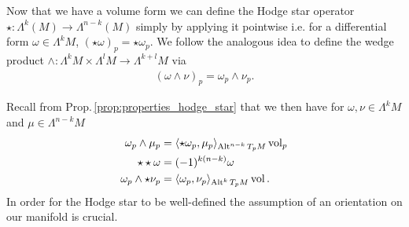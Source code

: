 \documentclass[../master_thesis.tex]{subfiles}
\begin{document}


Now that we have a volume form we can define the Hodge star operator
$\star: \Lambda^k(M) \rightarrow \Lambda^{n-k}(M)$ 
simply by applying it 
pointwise i.e. for a differential form $\omega \in \Lambda^k M$, $(\star \omega)_p = \star \omega_p$. 
We follow the analogous idea to define the wedge product
$\wedge: \Lambda^k M \times \Lambda^l M \rightarrow \Lambda^{k+l} M$ via
\begin{align*}
    (\omega \wedge \nu )_p = \omega_p \wedge \nu_p. 
\end{align*} 

Recall from Prop.\,\ref{prop:properties_hodge_star} that we then have for $\omega, \nu \in \Lambda^k M$ and 
$\mu \in \Lambda^{n-k} M$
\begin{align*}
    \omega_p \wedge \mu_p &= \langle \star \omega_p, \mu_p \rangle _{{\text{Alt}^{n-k}\,T_p M}} \operatorname{vol}_p
    \\ \star \star \omega &= (-1)^{k(n-k)} \omega
    \\ \omega_p \wedge \star \nu_p &= \langle \omega_p, \nu_p \rangle _{{\text{Alt}^{k}\,T_p M}} \operatorname{vol}.
\end{align*}
In order for 
the Hodge star to be well-defined the assumption of an orientation on our 
manifold is crucial. 
\end{document}
